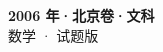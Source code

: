 \documentclass[zihao=-4, a4paper]{ctexart}
\begin{document}
\begin{center}
  {\Large\bfseries 2006 年·北京卷·文科}\\[4pt]
  {\large 数学 · 试题版}
\end{center}
\medskip
{}

\end{document}
